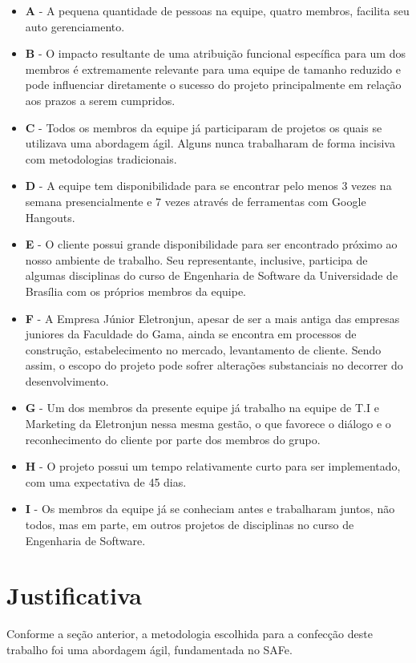 \begin{itemize}
\item \textbf{A} - A pequena quantidade de pessoas na equipe, quatro membros, facilita seu auto gerenciamento.
\item \textbf{B} - O impacto resultante de uma atribuição funcional específica para um dos membros é extremamente relevante para uma equipe de tamanho reduzido e pode influenciar diretamente o sucesso do projeto principalmente em relação aos prazos a serem cumpridos.
\item \textbf{C} - Todos os membros da equipe já participaram de projetos os quais se utilizava uma abordagem ágil. Alguns nunca trabalharam de forma incisiva com metodologias tradicionais.
\item \textbf{D} - A equipe tem disponibilidade para se encontrar pelo menos 3 vezes na semana presencialmente e 7 vezes através de ferramentas com Google Hangouts.
\item \textbf{E} - O cliente possui grande disponibilidade para ser encontrado próximo ao nosso ambiente de trabalho. Seu representante, inclusive, participa de algumas disciplinas do curso de Engenharia de Software da Universidade de Brasília com os próprios membros da equipe.
\item \textbf{F} - A Empresa Júnior Eletronjun, apesar de ser a mais antiga das empresas juniores da Faculdade do Gama, ainda se encontra em processos de construção, estabelecimento no mercado, levantamento de cliente. Sendo assim, o escopo do projeto pode sofrer alterações substanciais no decorrer do desenvolvimento.
\item \textbf{G} - Um dos membros da presente equipe já trabalho na equipe de T.I e Marketing da Eletronjun nessa mesma gestão, o que favorece o diálogo e o reconhecimento do cliente por parte dos membros do grupo.
\item \textbf{H} - O projeto possui um tempo relativamente curto para ser implementado, com uma expectativa de 45 dias.
\item \textbf{I} - Os membros da equipe já se conheciam antes e trabalharam juntos, não todos, mas em parte, em outros projetos de disciplinas no curso de Engenharia de Software.
\end{itemize}			

  \section{Justificativa}
Conforme a seção anterior, a metodologia escolhida para a confecção deste trabalho foi uma abordagem ágil, fundamentada no SAFe.


